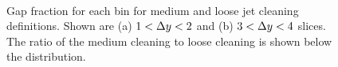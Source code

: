 \begin{figure}
\centering
\mbox{
              \quad
              \quad
                              }
\caption[Effect of jet cleaning on the gap fraction versus \dy{}]{
Gap fraction for each \ptb{} bin for medium and loose jet cleaning definitions. 
Shown are (a) $1<\mbox{$\Delta y$}{}<2$ and (b) $3<\mbox{$\Delta y$}{}<4$ slices.
The ratio of the medium cleaning to loose cleaning is shown below the distribution.
\label{JetCleanGF_pt}}
\end{figure}




